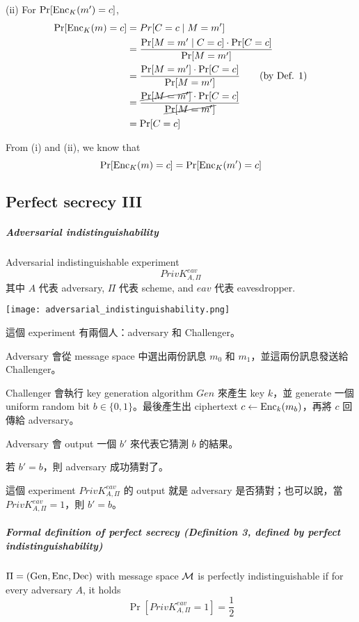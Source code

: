 (ii) For \(\Pr[\operatorname{Enc}_K(m') = c]\),
\begin{align*}
	\Pr[\operatorname{Enc}_K(m) = c] &= Pr[C = c \mid M = m']\\
	&= \frac{\Pr[M = m' \mid C = c] \cdot \Pr[C = c]}{\Pr[M = m']} \\
	&= \frac{\Pr[M = m'] \cdot \Pr[C =c]}{\Pr[M = m']} \tag{by Def. 1} \\
	&= \frac{\cancel{\Pr[M = m']} \cdot \Pr[C = c]}{\cancel{\Pr[M = m']}} \\
	&= \Pr[C = c]
\end{align*}

From (i) and (ii), we know that
\[ \Pr[\operatorname{Enc}_K(m) = c] = \Pr[\operatorname{Enc}_K(m') = c] \]


\subsection{Perfect secrecy III}

\subparagraph{Adversarial indistinguishability}

Adversarial indistinguishable experiment
\[PrivK_{A, \Pi}^{eav}\]
其中 \(A\) 代表 adversary, \(\Pi\) 代表 scheme, and \(eav\) 代表 eavesdropper.

\texttt{[image: adversarial\_indistinguishability.png]}

這個 experiment 有兩個人：adversary 和 Challenger。
\begin{steps}
	\item Adversary 會從 message space 中選出兩份訊息 \(m_0\) 和 \(m_1\)，並這兩份訊息發送給 Challenger。
	\item Challenger 會執行 key generation algorithm \(Gen\) 來產生 key \(k\)，並 generate 一個 uniform random bit \(b \in \{0,1\}\)。最後產生出 ciphertext \(c \leftarrow \operatorname{Enc}_k(m_b)\)，再將 \(c\) 回傳給 adversary。
	\item Adversary 會 output 一個 \(b'\) 來代表它猜測 \(b\) 的結果。
	\item 若 \(b' = b\)，則 adversary 成功猜對了。
\end{steps}

這個 experiment \(PrivK_{A, \Pi}^{eav}\) 的 output 就是 adversary 是否猜對；也可以說，當 \(PrivK_{A, \Pi}^{eav} = 1\)，則 \(b' = b\)。


\subparagraph{Formal definition of perfect secrecy (\textbf{Definition 3, defined by perfect indistinguishability})}

\(\Pi = (\operatorname{Gen}, \operatorname{Enc}, \operatorname{Dec})\) with message space \(\operatorname{\mathcal{M}}\) is perfectly indistinguishable if for every adversary \(A\), it holds
\[\Pr[PrivK_{A, \Pi}^{eav} = 1] = \frac{1}{2}\]

